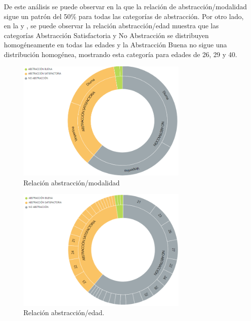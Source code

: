 \documentclass{textolivre}
\begin{document}
De este análisis se puede observar en la  que la relación de abstracción/modalidad sigue un patrón del 50\% para todas las categorías de abstracción. Por otro lado, en la  y , se puede observar la relación abstracción/edad muestra que las categorías Abstracción Satisfactoria y No Abstracción se distribuyen homogéneamente en todas las edades y la Abstracción Buena no sigue una distribución homogénea, mostrando esta categoría para edades de 26, 29 y 40.

\begin{figure}[htbp]
 \centering
 \includegraphics[width=0.75\textwidth]{figura3.png}
 \caption{Relación abstracción/modalidad}
 \label{figura 3}
\end{figure}

\begin{figure}[htbp]
 \centering
 \includegraphics[width=0.75\textwidth]{figura4.png}
 \caption{Relación abstracción/edad.}
 \label{figura 4}
\end{figure}
\end{document}
